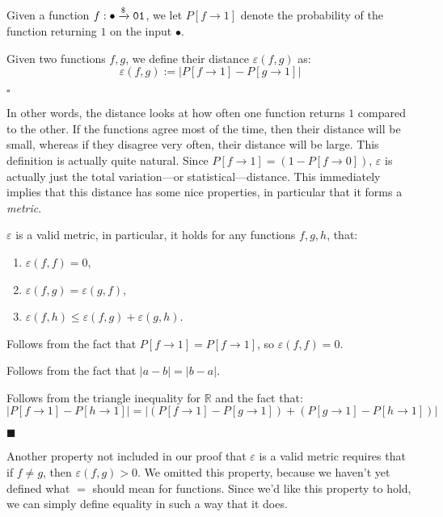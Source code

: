 \begin{definition}
    Given a function $f : \bullet \xrightarrow{\$} \texttt{01}$, we let
    $P[f \to 1]$ denote the probability
    of the function returning $1$ on the input $\bullet$.

    Given two functions $f, g$, we define their distance $\varepsilon(f, g)$ as:
    $$
    \varepsilon(f, g) := |P[f \to 1] - P[g \to 1]|
    $$

    $\square$
\end{definition}

In other words, the distance looks at how often one function returns $1$
compared to the other.
If the functions agree most of the time, then their distance will be small,
whereas if they disagree very often, their distance will be large.
This definition is actually quite natural.
Since $P[f \to 1] = (1 - P[f \to 0])$, $\varepsilon$ is actually
just the total variation---or statistical---distance.
This immediately implies that this distance has some nice properties,
in particular that it forms a \emph{metric}.

\begin{lemma}
    $\varepsilon$ is a valid metric, in particular, it holds
    for any functions $f, g, h$, that:
    \begin{enumerate}
        \item $\varepsilon(f, f) = 0$,
        \item $\varepsilon(f, g) = \varepsilon(g, f)$,
        \item $\varepsilon(f, h) \leq \varepsilon(f, g) + \varepsilon(g, h)$.
    \end{enumerate}


     Follows from the fact that $P[f \to 1] = P[f \to 1]$,
    so $\varepsilon(f, f) = 0$.

     Follows from the fact that $|a - b| = |b - a|$.

     Follows from the triangle inequality for $\mathbb{R}$
    and the fact that:
    $$
    |P[f \to 1] - P[h \to 1]| = |(P[f \to 1] - P[g \to 1]) + (P[g \to 1] - P[h \to 1])|
    $$

    $\blacksquare$
\end{lemma}

Another property not included in our proof that $\varepsilon$ is a valid metric
requires that if $f \neq g$, then $\varepsilon(f, g) > 0$.
We omitted this property, because we haven't yet defined what $=$
should mean for functions.
Since we'd like this property to hold, we can simply define
equality in such a way that it does.

